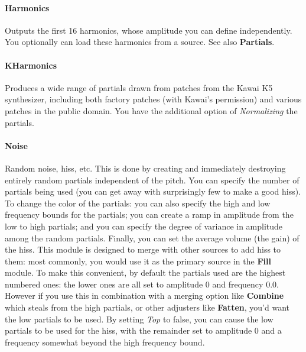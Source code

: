 \documentclass{article}
\begin{document}
\paragraph{Harmonics}  Outputs the first 16 harmonics, whose amplitude you can define independently.  You optionally can load these harmonics from a source. See also {\bf Partials}.

\paragraph{KHarmonics}  Produces a wide range of partials drawn from patches from the Kawai K5 synthesizer, including both factory patches (with Kawai's permission) and various patches in the public domain.  You have the additional option of {\it Normalizing} the partials.


\paragraph{Noise}  Random noise, hiss, etc.  This is done by creating and immediately destroying entirely random partials independent of the pitch.  You can specify the number of partials being used (you can get away with surprisingly few to make a good hiss).   To change the color of the partials: you can also specify the high and low frequency bounds for the partials; you can create a ramp in amplitude from the low to high partials; and you can specify the degree of variance in amplitude among the random partials.  Finally, you can set the average volume (the gain) of the hiss.  This module is designed to merge with other sources to add hiss to them: most commonly, you would use it as the primary source in the {\bf Fill} module.  To make this convenient, by default the partials used are the highest numbered ones: the lower ones are all set to amplitude 0 and frequency 0.0.  However if you use this in combination with a merging option like {\bf Combine} which steals from the high partials, or other adjusters like {\bf Fatten}, you'd want the low partials to be used.  By setting {\it Top} to false, you can cause the low partials to be used for the hiss, with the remainder set to amplitude 0 and a frequency somewhat beyond the high frequency bound.
\end{document}
